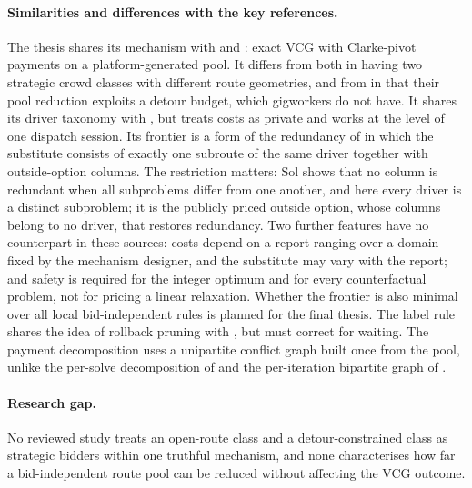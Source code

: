 \paragraph{Similarities and differences with the key references.}
The thesis shares its mechanism with \citet{zou2022mechanisms} and
\citet{li2026auction}: exact VCG with Clarke-pivot payments on a
platform-generated pool. It differs from both in having two strategic crowd
classes with different route geometries, and from \citet{li2026auction} in
that their pool reduction exploits a detour budget, which gigworkers do not
have. It shares its driver taxonomy with \citet{luy2024workforce}, but
treats costs as private and works at the level of one dispatch session. Its
frontier is a form of the redundancy of \citet{sol1994column} in which the
substitute consists of exactly one subroute of the same driver together
with outside-option columns. The restriction matters: Sol shows that no
column is redundant when all subproblems differ from one another, and here
every driver is a distinct subproblem; it is the publicly priced outside
option, whose columns belong to no driver, that restores redundancy.
Two further features have no counterpart in these sources: costs depend
on a report ranging over a domain fixed by the mechanism designer, and the
substitute may vary with the report; and safety is required for the integer
optimum and for every counterfactual problem, not for pricing a linear
relaxation. Whether the frontier is also minimal over all local
bid-independent rules is planned for the final thesis. The label rule
shares the idea of rollback pruning with \citet{lozano2016exact}, but must
correct for waiting. The payment decomposition uses a unipartite conflict
graph built once from the pool, unlike the per-solve decomposition of
\citet{sandholm2005cabob} and the per-iteration bipartite graph of
\citet{bunz2015faster}.

\paragraph{Research gap.} No reviewed study treats an open-route class and
a detour-constrained class as strategic bidders within one truthful
mechanism, and none characterises how far a bid-independent route pool can
be reduced without affecting the VCG outcome.

